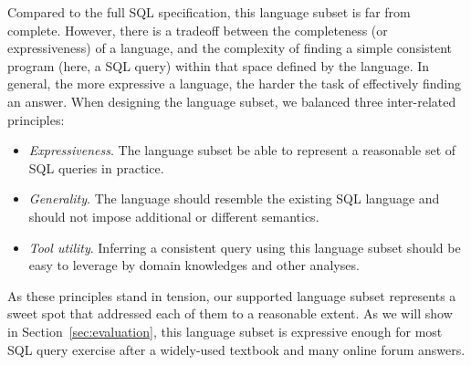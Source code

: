 Compared to the full SQL specification, this language subset is far from complete.
However, there is a tradeoff between the completeness (or expressiveness) of a language,
and the complexity of finding a simple consistent program (here, a SQL query)
within that space defined by the language. In general, the more expressive
a language, the harder the task of effectively finding an answer. When
designing the language subset, we balanced three inter-related principles:

\begin{itemize}

\item \textit{Expressiveness}. The language subset be able
to represent a reasonable set of SQL queries in practice.

\item \textit{Generality}. The language should resemble
the existing SQL language and should not impose additional
or different semantics.

\item \textit{Tool utility}. Inferring a consistent query
using this language subset should be easy to leverage by
domain knowledges and other analyses.

\end{itemize}

As these principles stand in tension, our supported language subset
represents a sweet spot that addressed each of them to a reasonable
extent. As we will show in Section~\ref{sec:evaluation}, this
language subset is expressive enough for most SQL query exercise
after a widely-used textbook and many online forum answers.

